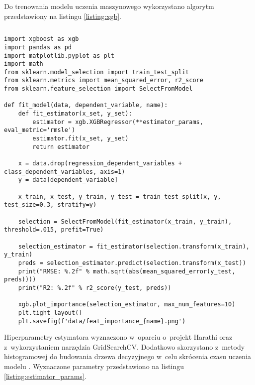 Do trenowania modelu uczenia maszynowego wykorzystano algorytm przedstawiony na listingu \ref{listing:xgb}.


\noindent\begin{minipage}{\textwidth}
    \begin{lstlisting}[caption={Algorytm uczenia modelu regresji}, label={listing:xgb}]
    \end{lstlisting}
    \hspace{.075\textwidth}\begin{minipage}{.85\textwidth}
        \begin{verbatim}
import xgboost as xgb
import pandas as pd
import matplotlib.pyplot as plt
import math
from sklearn.model_selection import train_test_split
from sklearn.metrics import mean_squared_error, r2_score
from sklearn.feature_selection import SelectFromModel

def fit_model(data, dependent_variable, name):
    def fit_estimator(x_set, y_set):
        estimator = xgb.XGBRegressor(**estimator_params, eval_metric='rmsle')
        estimator.fit(x_set, y_set)
        return estimator

    x = data.drop(regression_dependent_variables + class_dependent_variables, axis=1)
    y = data[dependent_variable]

    x_train, x_test, y_train, y_test = train_test_split(x, y, test_size=0.3, stratify=y)

    selection = SelectFromModel(fit_estimator(x_train, y_train), threshold=.015, prefit=True)

    selection_estimator = fit_estimator(selection.transform(x_train), y_train)
    preds = selection_estimator.predict(selection.transform(x_test))
    print("RMSE: %.2f" % math.sqrt(abs(mean_squared_error(y_test, preds))))
    print("R2: %.2f" % r2_score(y_test, preds))

    xgb.plot_importance(selection_estimator, max_num_features=10)
    plt.tight_layout()
    plt.savefig(f'data/feat_importance_{name}.png')
        \end{verbatim}
    \end{minipage}

    \raggedright\source{\ownwork}
    \vspace{0.75cm}
\end{minipage}

Hiperparametry estymatora wyznaczono w~oparciu o~projekt Harathi \cite{harathi-2018} oraz z~wykorzystaniem narzędzia GridSearchCV.
Dodatkowo skorzystano z~metody histogramowej do budowania drzewa decyzyjnego w~celu skrócenia czasu uczenia modelu \cite{golarnyk-2021}.
Wyznaczone parametry przedstawiono na listingu \ref{listing:estimator_params}.


